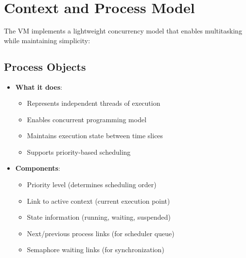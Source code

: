 \documentclass[12pt,a4paper]{report}
\begin{document}
\section{Context and Process Model}
The VM implements a lightweight concurrency model that enables multitasking while maintaining simplicity:

\subsection{Process Objects}
\begin{itemize}
    \item \textbf{What it does}:
    \begin{itemize}
        \item Represents independent threads of execution
        \item Enables concurrent programming model
        \item Maintains execution state between time slices
        \item Supports priority-based scheduling
    \end{itemize}
    
    \item \textbf{Components}:
    \begin{itemize}
        \item Priority level (determines scheduling order)
        \item Link to active context (current execution point)
        \item State information (running, waiting, suspended)
        \item Next/previous process links (for scheduler queue)
        \item Semaphore waiting links (for synchronization)
    \end{itemize}
\end{itemize}
\end{document}
